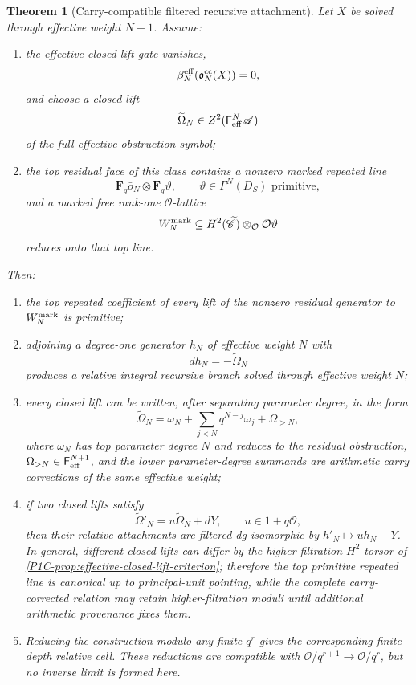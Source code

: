 \documentclass[11pt]{article}
\newtheorem{theorem}{Theorem}[section]
\theoremstyle{remark}
\newcommand{\F}{\mathbf F}
\begin{document}
\begin{theorem}[Carry-compatible filtered recursive attachment]
\label{P1C-thm:carry-compatible-filtered-recursion}
Let $X$ be solved through effective weight $N-1$.  Assume:
\begin{enumerate}[label=\textup{(A\arabic*)}]
\item the effective closed-lift gate vanishes,
\[
 \beta_N^{\rm eff}(\mathfrak o_N^{\rm cc}(X))=0,
\]
and choose a closed lift
\[
 \widetilde\Omega_N\in
 Z^2(\mathsf F_{\rm eff}^{N}\mathscr A)
\]
of the \emph{full} effective obstruction symbol;
\item the top residual face of this class contains a nonzero marked repeated line
\[
 \F_q\bar o_N\otimes\F_q\vartheta,
 \qquad
 \vartheta\in\Gamma^N(D_S)\text{ primitive},
\]
and a marked free rank-one $\mathcal O$-lattice
\[
 W_N^{\rm mark}
 \subseteq
 H^2(\widetilde{\mathscr C})\otimes_{\mathcal O}\mathcal O\vartheta
\]
reduces onto that top line.
\end{enumerate}
Then:
\begin{enumerate}[label=\textup{(\roman*)}]
\item the top repeated coefficient of every lift of the nonzero residual generator to
$W_N^{\rm mark}$ is primitive;
\item adjoining a degree-one generator $h_N$ of effective weight $N$ with
\[
 \boxed{dh_N=-\widetilde\Omega_N}
\]
produces a relative integral recursive branch solved through effective weight $N$;
\item every closed lift can be written, after separating parameter degree, in the form
\begin{equation}\label{P1C-eq:general-carry-compatible-relation}
 \boxed{
 \widetilde\Omega_N
 =\omega_N+
 \sum_{j<N}q^{N-j}\omega_j
 +\Omega_{>N},}
\end{equation}
where $\omega_N$ has top parameter degree $N$ and reduces to the residual obstruction,
$\Omega_{>N}\in\mathsf F_{\rm eff}^{N+1}$, and the lower parameter-degree summands are arithmetic
carry corrections of the same effective weight;
\item if two closed lifts satisfy
\[
 \widetilde\Omega'_N
 =u\widetilde\Omega_N+dY,
 \qquad u\in1+q\mathcal O,
\]
then their relative attachments are filtered-dg isomorphic by
$h'_N\mapsto u h_N-Y$.  In general, different closed lifts can differ by the higher-filtration
$H^2$-torsor of \cref{P1C-prop:effective-closed-lift-criterion}; therefore the \emph{top primitive repeated
line} is canonical up to principal-unit pointing, while the complete carry-corrected relation may
retain higher-filtration moduli until additional arithmetic provenance fixes them.
\item Reducing the construction modulo any finite $q^r$ gives the corresponding finite-depth relative
cell.  These reductions are compatible with $\mathcal O/q^{r+1}\to\mathcal O/q^r$, but no inverse
limit is formed here.
\end{enumerate}
\end{theorem}
\end{document}
